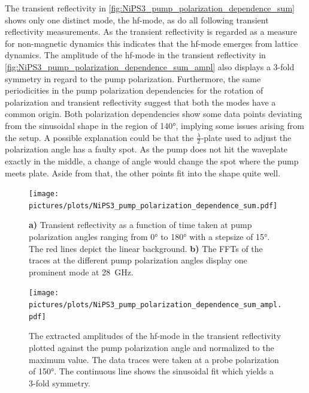 The transient reflectivity in \autoref{fig:NiPS3_pump_polarization_dependence_sum} shows only one distinct mode, the hf-mode, as do all following transient reflectivity measurements.
As the transient reflectivity is regarded as a measure for non-magnetic dynamics this indicates that the hf-mode emerges from lattice dynamics.
The amplitude of the hf-mode in the transient reflectivity in \autoref{fig:NiPS3_pump_polarization_dependence_sum_ampl} also displays a 3-fold symmetry in regard to the pump polarization.
Furthermore, the same periodicities in the pump polarization dependencies for the rotation of polarization and transient reflectivity suggest that both the modes have a common origin.
Both polarization dependencies show some data points deviating from the sinusoidal shape in the region of 140°, implying some issues arising from the setup.
A possible explanation could be that the $\frac{\lambda}{2}$-plate used to adjust the polarization angle has a faulty spot.
As the pump does not hit the waveplate exactly in the middle, a change of angle would change the spot where the pump meets plate.
Aside from that, the other points fit into the shape quite well.
\begin{figure}[hbt!]
    \centering
    \texttt{[image: pictures/plots/NiPS3\_pump\_polarization\_dependence\_sum.pdf]} \vspace{-0.3cm}
    \caption{\textbf{a)} Transient reflectivity as a function of time taken at pump polarization angles ranging from 0° to 180° with a stepsize of 15°. The red lines depict the linear background. \textbf{b)} The FFTs of the traces at the different pump polarization angles display one prominent mode at \qty{28}{GHz}.}
    \label{fig:NiPS3_pump_polarization_dependence_sum}
\end{figure}
\begin{figure}[hbt!]
    \centering  
    \texttt{[image: pictures/plots/NiPS3\_pump\_polarization\_dependence\_sum\_ampl.pdf]} \vspace{-0.3cm}
    \caption{The extracted amplitudes of the hf-mode in the transient reflectivity plotted against the pump polarization angle and normalized to the maximum value. The data traces were taken at a probe polarization of 150°. The continuous line shows the sinusoidal fit which yields a 3-fold symmetry.}
    \label{fig:NiPS3_pump_polarization_dependence_sum_ampl}
\end{figure}
\FloatBarrier

\newpage
